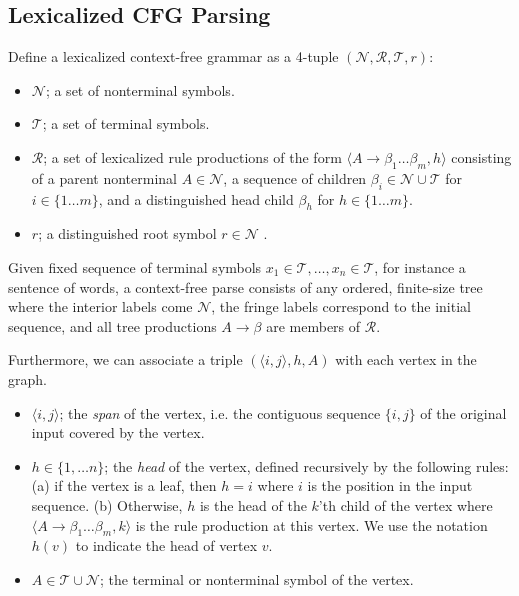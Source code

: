 \documentclass[11pt,letterpaper]{article}
\newcommand{\nonterms}{\mathcal{N}}
\newcommand{\rules}{\mathcal{R}}
\newcommand{\terms}{\mathcal{T}}
\newcommand{\Span}[1]{\langle #1 \rangle}
\begin{document}
\subsection{Lexicalized CFG Parsing}

Define a lexicalized context-free grammar as a 4-tuple $(\nonterms, \rules, \terms, r)$:
\begin{itemize}
\item $\nonterms$; a set of nonterminal symbols.
\item $\terms$; a set of terminal symbols.
\item $\rules$; a set of lexicalized rule productions of the form $\langle A \rightarrow \beta_1 \ldots \beta_m, h\rangle$ consisting of a parent nonterminal $A \in \nonterms$, a sequence of children $\beta_i \in \nonterms \cup \terms$ for $i \in \{1\ldots m\}$, and a distinguished head child $\beta_h$ for $h\in \{1 \ldots m\}$.
\item $r$; a distinguished root symbol $r \in \nonterms$ .
\end{itemize}


Given fixed sequence of terminal symbols $x_1 \in \terms, \ldots, x_n \in \terms$, for instance a sentence of words, a context-free parse consists of any ordered, finite-size tree where the interior labels come $\nonterms$, the fringe labels correspond to the initial sequence, and all tree productions $A \rightarrow \beta$ are members of $\rules$.

Furthermore, we can associate a triple $(\Span{i, j}, h, A)$ with each vertex in the graph.


\begin{itemize}
\item $\Span{i,j}$; the \textit{span}  of the vertex, i.e. the contiguous sequence $\{i, j\}$ of the original input covered by the vertex.

\item $h \in \{1, \ldots n\}$; the \textit{head} of the vertex, defined recursively by the following rules: (a) if the vertex is a leaf, then $h=i$ where $i$ is the position in the input sequence. (b) Otherwise,  $h$ is the head of the $k$'th child of the vertex where $\langle A \rightarrow \beta_1 \ldots \beta_m, k\rangle$  is the rule production at this vertex. We use the notation $h(v)$ to indicate the head of vertex $v$.
\item $A \in \terms \cup \nonterms$; the terminal or nonterminal symbol of the vertex.
\end{itemize}
\end{document}
